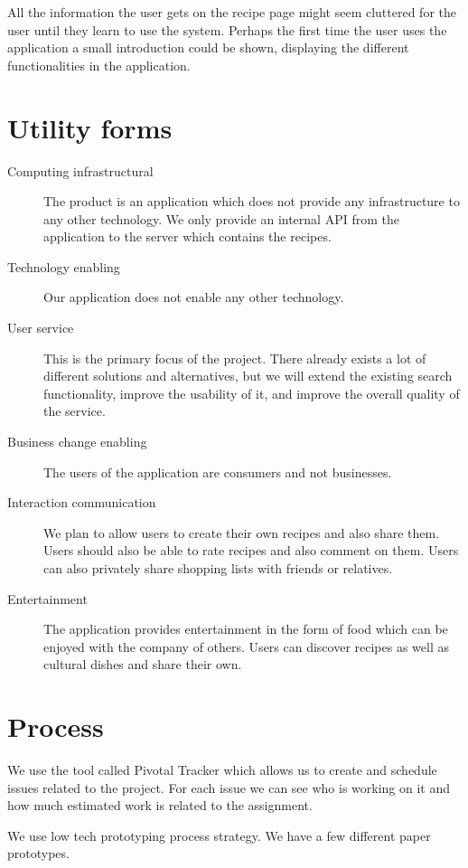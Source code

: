 All the information the user gets on the recipe page might seem cluttered for the user until they learn to use the system. Perhaps the first time the user uses the application a small introduction could be shown, displaying the different functionalities in the application.



\section*{Utility forms}

\begin{description}
\item[Computing infrastructural] The product is an application which does not provide any infrastructure to any other technology. We only provide an internal API from the application to the server which contains the recipes.
\item[Technology enabling] Our application does not enable any other technology.
\item[User service] This is the primary focus of the project. There already exists a lot of different solutions and alternatives, but we will extend the existing search functionality, improve the usability of it, and improve the overall quality of the service.
\item[Business change enabling] The users of the application are consumers and not businesses.
\item[Interaction communication] We plan to allow users to create their own recipes and also share them. Users should also be able to rate recipes and also comment on them. Users can also privately share shopping lists with friends or relatives.
\item[Entertainment] The application provides entertainment in the form of food which can be enjoyed with the company of others. Users can discover recipes as well as cultural dishes and share their own.
\end{description}

\section*{Process}

We use the tool called Pivotal Tracker which allows us to create and schedule issues related to the project. For each issue we can see who is working on it and how much estimated work is related to the assignment.

We use low tech prototyping process strategy. We have a few different paper prototypes.

